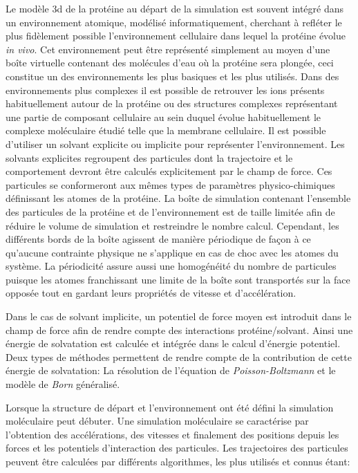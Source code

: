 Le modèle 3d de la protéine au départ de la simulation est souvent intégré dans un environnement atomique, modélisé informatiquement, cherchant à refléter le plus fidèlement possible l'environnement cellulaire dans lequel la protéine évolue \textit{in vivo}. Cet environnement peut être représenté simplement au moyen d'une boîte virtuelle contenant des molécules d'eau où la protéine sera plongée, ceci constitue un des environnements les plus basiques et les plus utilisés. Dans des environnements plus complexes il est possible de retrouver les ions présents habituellement autour de la protéine ou des structures complexes représentant une partie de composant cellulaire au sein duquel évolue habituellement le complexe moléculaire étudié telle que la membrane cellulaire. Il est possible d'utiliser un solvant explicite ou implicite pour représenter l'environnement. Les solvants explicites regroupent des particules dont la trajectoire et le comportement devront être calculés explicitement par le champ de force. Ces particules se conformeront aux mêmes types de paramètres physico-chimiques définissant les atomes de la protéine. 
La boîte de simulation contenant l'ensemble des particules de la protéine et de l'environnement est de taille limitée afin de réduire le volume de simulation et restreindre le nombre calcul. Cependant, les différents bords de la boîte agissent de manière périodique de façon à ce qu'aucune contrainte physique ne s'applique en cas de choc avec les atomes du système. La périodicité assure aussi une homogénéité du nombre de particules puisque les atomes franchissant une limite de la boîte sont transportés sur la face opposée tout en gardant leurs propriétés de vitesse et d'accélération.

Dans le cas de solvant implicite, un potentiel de force moyen est introduit dans le champ de force afin de rendre compte des interactions protéine/solvant. Ainsi une énergie de solvatation est calculée et intégrée dans le calcul d'énergie potentiel. Deux types de méthodes permettent de rendre compte de la contribution de cette énergie de solvatation: La résolution de l'équation de \textit{Poisson-Boltzmann} et le modèle de \textit{Born} généralisé.

Lorsque la structure de départ et l'environnement ont été défini la simulation moléculaire peut débuter. Une simulation moléculaire se caractérise par l'obtention des accélérations, des vitesses et finalement des positions depuis les forces et les potentiels d'interaction des particules. Les trajectoires des particules peuvent être calculées par différents algorithmes, les plus utilisés et connus étant:


